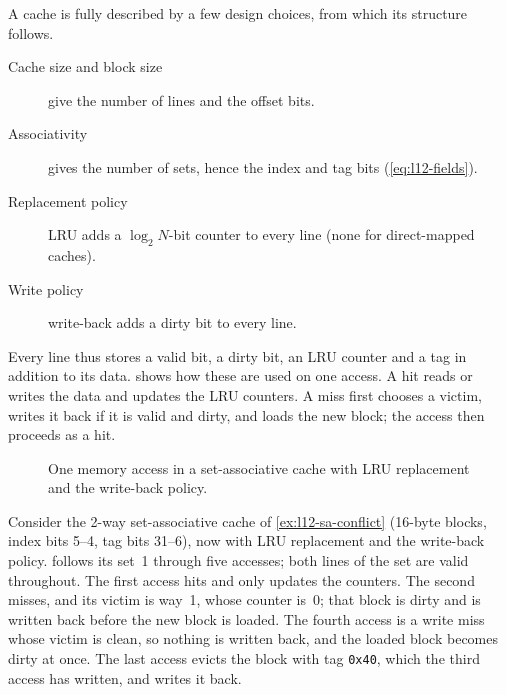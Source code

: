 \documentclass[../main.tex]{subfiles}
\begin{document}
A cache is fully described by a few design choices, from which its structure
follows.
\begin{description}
  \item[Cache size and block size] give the number of lines and the offset
    bits.
  \item[Associativity] gives the number of sets, hence the index and tag bits
    (\cref{eq:l12-fields}).
  \item[Replacement policy] LRU adds a $\log_2 N$-bit counter to every line
    (none for direct-mapped caches).
  \item[Write policy] write-back adds a dirty bit to every line.
\end{description}
Every line thus stores a valid bit, a dirty bit, an LRU counter and a tag in
addition to its data.   shows how these are used on
one access.  A hit reads or writes the data and updates the LRU counters.  A
miss first chooses a victim, writes it back if it is valid and dirty, and
loads the new block; the access then proceeds as a hit.

\begin{figure}[tb]
  \centering
  
  \caption{One memory access in a set-associative cache with LRU replacement
    and the write-back policy.}
  \label{fig:l12-access-flow}
\end{figure}

\begin{example}
  \label{ex:l12-summary-trace}
  Consider the 2-way set-associative cache of \cref{ex:l12-sa-conflict}
  (16-byte blocks, index bits 5--4, tag bits 31--6), now with LRU replacement
  and the write-back policy.   follows its set~1 through
  five accesses; both lines of the set are valid throughout.  The first
  access hits and only updates the counters.  The second misses, and its
  victim is way~1, whose counter is~0; that block is dirty and is written
  back before the new block is loaded.  The fourth access is a write miss
  whose victim is clean, so nothing is written back, and the loaded block
  becomes dirty at once.  The last access evicts the block with tag
  \texttt{0x40}, which the third access has written, and writes it back.
\end{example}
\end{document}
